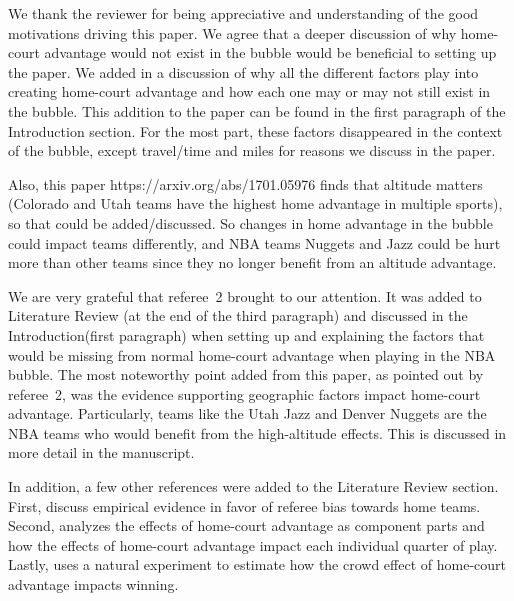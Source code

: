 \documentclass[12pt]{article}
\newenvironment{comment}%
{\begin{quoting}\noindent\small\it\ignorespaces%
  }{\end{quoting}}
\begin{document}
 We thank the reviewer for being appreciative and understanding of the 
 good motivations driving this paper. We agree that a deeper discussion 
 of why home-court advantage would not exist in the bubble would be beneficial 
 to setting up the paper. We added in a discussion of why all the different 
 factors play into creating home-court advantage and how each one may or may 
 not still exist in the bubble. This addition to the paper can be found in the first paragraph
 of the Introduction section. For the most part, these factors disappeared 
 in the context of the bubble, except travel/time and miles for reasons we
 discuss in the paper. 

\begin{comment}
Also, this paper https://arxiv.org/abs/1701.05976 finds that altitude matters
(Colorado and Utah teams have the highest home advantage in multiple sports),
so that could be added/discussed. So changes in home advantage in the bubble
could impact teams differently, and NBA teams Nuggets and Jazz could be hurt
more than other teams since they no longer benefit from an altitude advantage.
\end{comment}

We are very grateful that referee~2 brought \citet{Lopez} to our attention. 
It was added to Literature Review (at the end of the third paragraph) and
discussed in the Introduction(first paragraph) when setting 
up and explaining the factors that would be missing from normal home-court 
advantage when playing in the NBA bubble. The most noteworthy point added 
from this paper, as pointed out by referee~2, was the evidence supporting 
geographic factors impact home-court advantage. Particularly, teams like 
the Utah Jazz and Denver Nuggets are the NBA teams who would benefit from 
the high-altitude effects. This is discussed in more detail in the manuscript.


In addition, a few other references were added to the Literature Review section.
First, \cite{Price} discuss empirical evidence in favor of referee bias towards
home teams. Second, \cite{Jones} analyzes the effects of home-court advantage
as component parts and how the effects of home-court advantage impact each 
individual quarter of play. Lastly, \cite{Boudreaux} uses a natural
experiment to estimate how the crowd effect of home-court advantage impacts winning.
\end{document}

